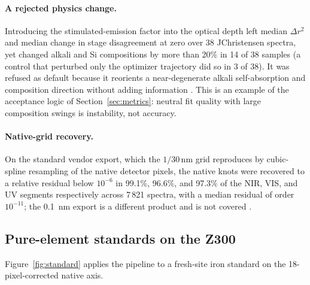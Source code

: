 \paragraph{A rejected physics change.}
Introducing the stimulated-emission factor into the optical depth left median $\Delta r^2$ and median change in stage disagreement at zero over 38 JChristensen spectra, yet changed alkali and Si compositions by more than 20\% in 14 of 38 samples (a control that perturbed only the optimizer trajectory did so in 3 of 38). It was refused as default because it reorients a near-degenerate alkali self-absorption and composition direction without adding information %
. This is an example of the acceptance logic of Section~\ref{sec:metrics}: neutral fit quality with large composition swings is instability, not accuracy.

\paragraph{Native-grid recovery.}
On the standard vendor export, which the $1/30$\,\si{\nano\metre} grid reproduces by cubic-spline resampling of the native detector pixels, the native knots were recovered to a relative residual below $10^{-6}$ in 99.1\%, 96.6\%, and 97.3\% of the NIR, VIS, and UV segments respectively across 7\,821 spectra, with a median residual of order $10^{-11}$; the \SI{0.1}{\nano\metre} export is a different product and is not covered %
.

\subsection{Pure-element standards on the Z300}

Figure~\ref{fig:standard} applies the pipeline to a fresh-site iron standard on the 18-pixel-corrected native axis.

